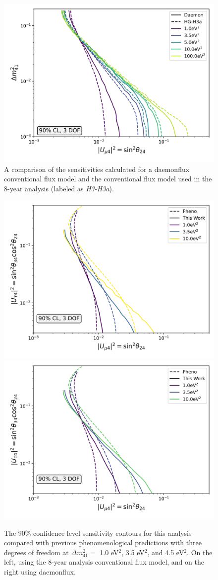 \documentclass[main.tex]{subfiles}
\begin{document}
\begin{figure}
    \centering
    \includegraphics[width=0.7\linewidth]{figures/double_joint_full_daemon_Realization_daemon_Asimov_sterile_0_cl0.9_dof3.png}
    \caption{A comparison of the sensitivities calculated for a daemonflux conventional flux model and the conventional flux model used in the 8-year analysis (labeled as \textit{H3-H3a}).}\label{fig:asimov_model_compare}
\end{figure}


\begin{figure}
    \centering
    \includegraphics[width=0.45\linewidth]{figures/pheno_joint_asimov_oldairs_Realization_Asimov_sterile_0_cl0.9_dof3.png}%
    \includegraphics[width=0.45\linewidth]{figures/pheno_joint_daemon_update_Realization_daemon_Asimov_sterile_0_cl0.9_dof3.png}
    \caption{The 90\% confidence level sensitivity contours for this analysis compared with previous phenomenological predictions with three degrees of freedom at $\Delta m_{41}^{2}=$ 1.0 eV$^{2}$, 3.5 eV$^{2}$, and  4.5 eV$^{2}$. On the left, using the 8-year analysis conventional flux model, and on the right using daemonflux.}\label{fig:pheno_compare}
\end{figure}
\end{document}
